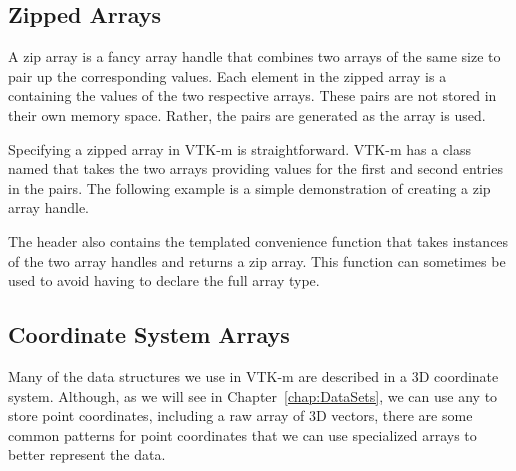 
\subsection{Zipped Arrays}
\label{sec:ZippedArrays}


A zip array is a fancy array handle that combines two arrays of the same
size to pair up the corresponding values. Each element in the zipped array
is a  containing the values of the two respective arrays. These
pairs are not stored in their own memory space. Rather, the pairs are
generated as the array is used.

Specifying a zipped array in VTK-m is straightforward. VTK-m has a class
named  that takes the two arrays providing values
for the first and second entries in the pairs. The following example is a
simple demonstration of creating a zip array handle.


The  header also contains the
templated convenience function  that takes
instances of the two array handles and returns a zip array. This function
can sometimes be used to avoid having to declare the full array type.



\subsection{Coordinate System Arrays}
\label{sec:CoordinateSystemArrays}

Many of the data structures we use in VTK-m are described in a 3D
coordinate system. Although, as we will see in Chapter~\ref{chap:DataSets},
we can use any  to store point coordinates,
including a raw array of 3D vectors, there are some common patterns for
point coordinates that we can use specialized arrays to better represent
the data.


